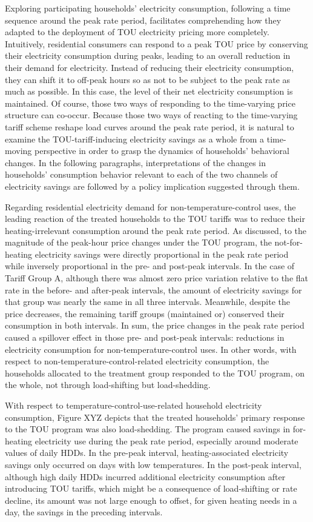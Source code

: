 Exploring participating households' electricity consumption, following a time sequence around the peak rate period, facilitates comprehending how they adapted to the deployment of TOU electricity pricing more completely. Intuitively, residential consumers can respond to a peak TOU price by conserving their electricity consumption during peaks, leading to an overall reduction in their demand for electricity. Instead of reducing their electricity consumption, they can shift it to off-peak hours so as not to be subject to the peak rate as much as possible. In this case, the level of their net electricity consumption is maintained. Of course, those two ways of responding to the time-varying price structure can co-occur. Because those two ways of reacting to the time-varying tariff scheme reshape load curves around the peak rate period, it is natural to examine the TOU-tariff-inducing electricity savings as a whole from a time-moving perspective in order to grasp the dynamics of households' behavioral changes. In the following paragraphs, interpretations of the changes in households' consumption behavior relevant to each of the two channels of electricity savings are followed by a policy implication suggested through them. 

Regarding residential electricity demand for non-temperature-control uses, the leading reaction of the treated households to the TOU tariffs was to reduce their heating-irrelevant consumption around the peak rate period. As discussed, to the magnitude of the peak-hour price changes under the TOU program, the not-for-heating electricity savings were directly proportional in the peak rate period while inversely proportional in the pre- and post-peak intervals. In the case of Tariff Group A, although there was almost zero price variation relative to the flat rate in the before- and after-peak intervals, the amount of electricity savings for that group was nearly the same in all three intervals. Meanwhile, despite the price decreases, the remaining tariff groups (maintained or) conserved their consumption in both intervals. In sum, the price changes in the peak rate period caused a spillover effect in those pre- and post-peak intervals: reductions in electricity consumption for non-temperature-control uses. In other words, with respect to non-temperature-control-related electricity consumption, the households allocated to the treatment group responded to the TOU program, on the whole, not through load-shifting but load-shedding. 

With respect to temperature-control-use-related household electricity consumption, Figure XYZ depicts that the treated households' primary response to the TOU program was also load-shedding. The program caused savings in for-heating electricity use during the peak rate period, especially around moderate values of daily HDDs. In the pre-peak interval, heating-associated electricity savings only occurred on days with low temperatures. In the post-peak interval, although high daily HDDs incurred additional electricity consumption after introducing TOU tariffs, which might be a consequence of load-shifting or rate decline, its amount was not large enough to offset, for given heating needs in a day, the savings in the preceding intervals.

